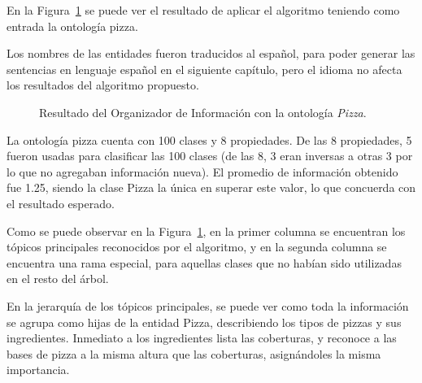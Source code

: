 En la Figura~\ref{fig:caso_estudio_pizza} se puede ver el resultado de aplicar el algoritmo teniendo como entrada la ontología pizza. 

Los nombres de las entidades fueron traducidos al español, para poder generar las sentencias en lenguaje español en el siguiente capítulo, pero el idioma no afecta los resultados del algoritmo propuesto.

\begin{figure}
\begin{multicols}{2}
\begin{figure}[H]
\end{figure}

\begin{figure}[H]
\end{figure}
\end{multicols}
\caption{Resultado del Organizador de Información con la ontología \emph{Pizza}.}
\label{fig:caso_estudio_pizza}
\end{figure}

La ontología pizza cuenta con 100 clases y 8 propiedades. De las 8 propiedades, 5 fueron usadas  para clasificar las 100 clases (de las 8, 3 eran inversas a otras 3 por lo que no agregaban información nueva). El promedio de información obtenido fue 1.25, siendo la clase Pizza la única en superar este valor, lo que concuerda con el resultado esperado.

Como se puede observar en la Figura~\ref{fig:caso_estudio_pizza}, en la primer columna se encuentran los tópicos principales reconocidos por el algoritmo, y en la segunda columna se encuentra una rama especial, para aquellas clases que no habían sido utilizadas en el resto del árbol.

En la jerarquía de los tópicos principales, se puede ver como toda la información se agrupa como hijas de la entidad Pizza, describiendo los tipos de pizzas y sus ingredientes. Inmediato a los ingredientes lista las coberturas, y reconoce a las bases de pizza a la misma altura que las coberturas, asignándoles la misma importancia.

